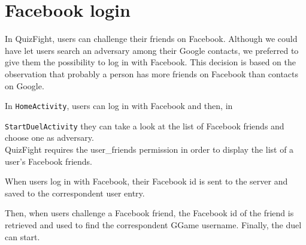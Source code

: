 \section{Facebook login}\label{sec:fb}

In QuizFight, users can challenge their friends on Facebook.
Although we could have let users search an adversary among their Google
contacts, we preferred to give them the possibility to log in with Facebook.
This decision is based on the observation that probably a person has more
friends on Facebook than contacts on Google.

In \texttt{HomeActivity}, users can log in with Facebook and then, in

\texttt{StartDuelActivity} they can take a look at the list of
Facebook friends and choose one as adversary. \\

QuizFight requires the user\_friends permission in order to display the
list of a user's Facebook friends.

When users log in with Facebook, their Facebook id is sent to the server and
saved to the correspondent user entry.

Then, when users challenge a Facebook friend, the Facebook id of the friend
is retrieved and used to find the correspondent GGame username.
Finally, the duel can start.
